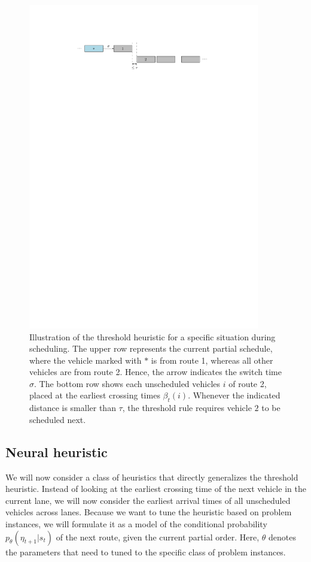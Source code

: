 \documentclass[a4paper]{article}
\theoremstyle{definition}
\theoremstyle{plain}
\begin{document}
\begin{figure}
  \centering
  \includegraphics[width=0.9\textwidth]{figures/threshold}
  \caption{Illustration of the threshold heuristic for a specific situation
    during scheduling. The upper row represents the current partial schedule,
    where the vehicle marked with $*$ is from route 1, whereas all other
    vehicles are from route 2. Hence, the arrow indicates the switch time $\sigma$.
    The bottom row shows each unscheduled vehicles $i$ of route 2, placed at the
    earliest crossing times $\beta_{t}(i)$. Whenever the indicated distance is
    smaller than $\tau$, the threshold rule requires vehicle $2$ to be scheduled
    next.}\label{fig:threshold_heuristic}
\end{figure}


\subsection{Neural heuristic}
\label{sec:neural}

We will now consider a class of heuristics that directly generalizes the
threshold heuristic. Instead of looking at the earliest crossing time of the
next vehicle in the current lane, we will now consider the earliest arrival
times of all unscheduled vehicles across lanes.
%
Because we want to tune the heuristic based on problem instances, we will
formulate it as a model of the conditional probability
$p_{\theta}(\eta_{t+1} | s_{t})$ of the next route, given the current partial
order. Here, $\theta$ denotes the parameters that need to tuned to the specific class
of problem instances.
\end{document}
